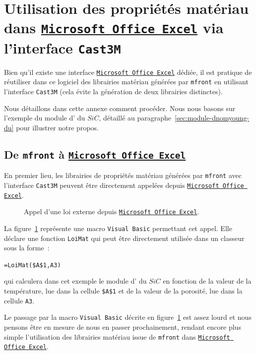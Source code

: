 \documentclass[rectoverso,pleiades,pstricks,leqno,anti]{texmf/note_technique_2010}
\newcommand{\mfront}{\texttt{mfront}}
\newcommand{\castem}{\texttt{Cast3M}}
\newcommand{\sic}{$SiC$}
\newcommand{\excel}{\href{http://www.microsoft.com/france/office/2007/programs/excel/overview.mspx}{\texttt{Microsoft Office Excel}}}
\newcommand{\code}[1]{
  \psframebox[linecolor=ceaorange,shadow=true,blur=true]{
    \begin{minipage}[htbp]{1.0\linewidth}
      \ttfamily\scriptsize #1
    \end{minipage}
  }
}
\begin{document}
\clearpage
\newpage
\section{Utilisation des propriétés matériau dans \excel{} via l'interface \castem{}}
\label{sec:inter-avec-excel}


Bien qu'il existe une interface \excel{} dédiée, il est pratique de
réutiliser dans ce logiciel des librairies matériau générées par
\mfront{} en utilisant l'interface \castem{} (cela évite la génération
de deux librairies distinctes).

Nous détaillons dans cette annexe comment procéder. Nous nous basons sur
l'exemple du module d' du \sic{}, détaillé au
paragraphe~\ref{sec:module-dnomyoung-du} pour illustrer notre propos.

\subsection{De \mfront{} à \excel{}}

En premier lieu, les librairies de propriétés matériau générées par
\mfront{} avec l'interface \castem{} peuvent être directement appelées
depuis \excel{}.

\begin{figure}[htbp]
  \centering
  \code{
    
  }
  \caption{Appel d'une loi externe depuis \excel{}.}
  \label{fig:excelvba}
\end{figure}

La figure~\ref{fig:excelvba} représente une macro
\texttt{Visual Basic} permettant cet appel. Elle déclare une fonction
\texttt{LoiMat} qui peut être directement utilisée dans un classeur
sous la forme~:
\begin{center}
  \begin{minipage}[htbp]{0.9\linewidth}
    \small
    \texttt{=LoiMat(\$A\$1,A3)}
  \end{minipage}
\end{center}
qui calculera dans cet exemple le module d' du \sic{} en
fonction de la valeur de la température, lue dans la cellule
\texttt{\$A\$1} et de la valeur de la porosité, lue dans la cellule
\texttt{A3}. 

Le passage par la macro \texttt{Visual Basic} décrite en
figure~\ref{fig:excelvba} est assez lourd et nous pensons être en
mesure de nous en passer prochainement, rendant encore plus simple
l'utilisation des librairies matériau issue de \mfront{} dans
\excel{}.
\end{document}
